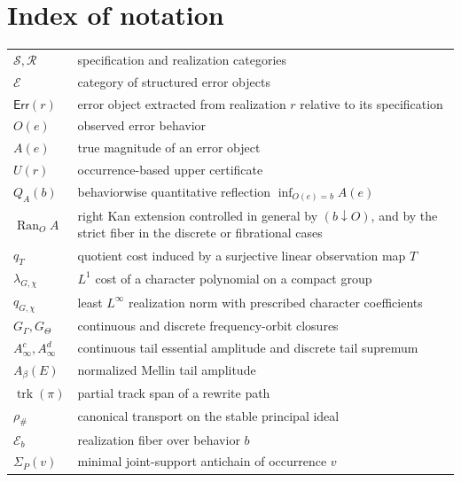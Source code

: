 \documentclass[12pt,a4paper,twoside]{extarticle}
\theoremstyle{compactplain}
\theoremstyle{compactdef}
\newcommand{\Err}{\mathsf{Err}}
\newcommand{\Ran}{\operatorname{Ran}}
\newcommand{\trk}{\operatorname{trk}}
\begin{document}
\appendix
\section{Index of notation}
\begin{longtable}{@{}>{\raggedright\arraybackslash}p{.19\linewidth}p{.77\linewidth}@{}}
$\mathcal S,\mathcal R$ & specification and realization categories\\
$\mathcal E$ & category of structured error objects\\
$\Err(r)$ & error object extracted from realization $r$ relative to its specification\\
$O(e)$ & observed error behavior\\
$A(e)$ & true magnitude of an error object\\
$U(r)$ & occurrence-based upper certificate\\
$Q_A(b)$ & behaviorwise quantitative reflection $\inf_{O(e)=b}A(e)$\\
$\Ran_OA$ & right Kan extension controlled in general by $(b\downarrow O)$, and by the strict fiber in the discrete or fibrational cases\\
$q_T$ & quotient cost induced by a surjective linear observation map $T$\\
$\lambda_{G,\chi}$ & $L^1$ cost of a character polynomial on a compact group\\
$q_{G,\chi}$ & least $L^\infty$ realization norm with prescribed character coefficients\\
$G_\Gamma,G_\Theta$ & continuous and discrete frequency-orbit closures\\
$A_\infty^c,A_\infty^d$ & continuous tail essential amplitude and discrete tail supremum\\
$A_\beta(E)$ & normalized Mellin tail amplitude\\
$\trk(\pi)$ & partial track span of a rewrite path\\
$\rho_\#$ & canonical transport on the stable principal ideal\\
$\mathcal E_b$ & realization fiber over behavior $b$\\
$\Sigma_P(v)$ & minimal joint-support antichain of occurrence $v$\\
\end{longtable}
\end{document}
